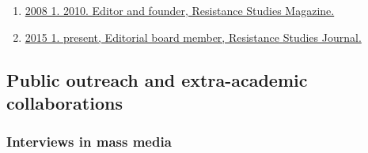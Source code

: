 \documentclass[
]{article}
\providecommand{\tightlist}{%
  \setlength{\itemsep}{0pt}\setlength{\parskip}{0pt}}
\begin{document}
\begin{enumerate}
\def\labelenumi{\arabic{enumi}.}
\tightlist
\item
  \href{http://resistance-journal.org/the-old-rs-mag/}{2008 1. 2010.
  Editor and founder, Resistance Studies Magazine.}
\item
  \href{http://resistance-journal.org/editorialboard/}{2015 1. present,
  Editorial board member, Resistance Studies Journal.}
\end{enumerate}

\hypertarget{public-outreach-and-extra-academic-collaborations}{%
\subsection{Public outreach and extra-academic
collaborations}\label{public-outreach-and-extra-academic-collaborations}}

\hypertarget{interviews-in-mass-media}{%
\subsubsection{Interviews in mass
media}\label{interviews-in-mass-media}}
\end{document}
